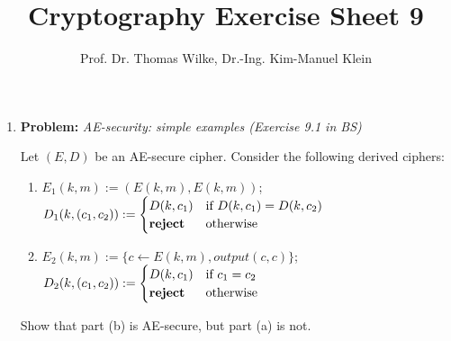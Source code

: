 \documentclass[11pt]{article}
\begin{document}
	
	\title{\textbf{Cryptography Exercise Sheet 9}}
	\author{Prof. Dr. Thomas Wilke, Dr.-Ing. Kim-Manuel Klein}
	\maketitle
	\medskip
	
	\begin{enumerate}
		
		\item
		\textbf{Problem:} \textit{AE-security: simple examples (Exercise 9.1 in BS)}
		
		Let $(E, D)$ be an AE-secure cipher. Consider the following derived ciphers:
		
		\begin{enumerate}
			\item $E_1(k,m) := (E(k,m), E(k,m))$;                                  $D_1(k, (c_1, c_2)) := \begin{cases} D(k,c_1) & \text{if $D(k,c_1) = D(k,c_2)$ }\\ {\bf reject}& \text{otherwise}\end{cases}$
			
			\item $E_2(k,m) := \{c \xleftarrow{}E(k,m),  output(c,c) \}$; $D_2(k, (c_1, c_2)) := \begin{cases} D(k,c_1) & \text{if $c_1 = c_2$ }\\ {\bf reject}& \text{otherwise}\end{cases}$
		\end{enumerate}
	
	Show that part (b) is AE-secure, but part (a) is not.
	\end{enumerate}
	
\end{document}
